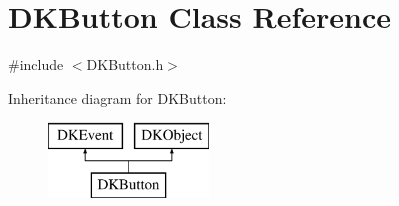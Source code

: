 \hypertarget{class_d_k_button}{\section{D\-K\-Button Class Reference}
\label{class_d_k_button}
}


{\ttfamily \#include $<$D\-K\-Button.\-h$>$}

Inheritance diagram for D\-K\-Button\-:\begin{figure}[H]
\begin{center}
\leavevmode
\includegraphics[height=2.000000cm]{class_d_k_button}
\end{center}
\end{figure}
